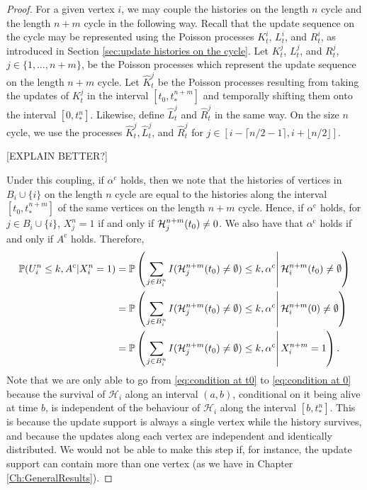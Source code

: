 \begin{proof}
		For a given vertex $i$, we may couple the histories on the length $n$ cycle and the length $n+m$ cycle in the following way. Recall that the update sequence on the cycle may be represented using the Poisson processes $K_t^i$, $L_t^i$, and $R_t^i$, as introduced in Section \ref{sec:update histories on the cycle}. Let $K_t^j$, $L_t^j$, and $R_t^j$, $j \in \{1,\dots, n+m\}$, be the Poisson processes which represent the update sequence on the length $n+m$ cycle. Let $\hat{K}_t^j$ be the Poisson processes resulting from taking the updates of $K_t^j$ in the interval $[t_0, t_*^{n+m}]$ and temporally shifting them onto the interval $[0, t_*^n]$. Likewise, define $\hat{L}_t^j$ and $\hat{R}_t^j$ in the same way. On the size $n$ cycle, we use the processes $\hat{K}_t^j, \hat{L}_t^j$, and $\hat{R}_t^j$ for $j \in [i- \lceil n/2 - 1 \rceil, i + \lfloor n/2\rfloor]$. 

		[EXPLAIN BETTER?]

		Under this coupling, if $\alpha^\mathrm{c}$ holds, then we note that the histories of vertices in $B_i \cup \{i\}$ on the length $n$ cycle are equal to the histories along the interval $[t_0, t_*^{n+m}]$ of the same vertices on the length $n+m$ cycle. Hence, if $\alpha^\mathrm{c}$ holds, for $j \in B_i \cup \{i\}$, $X_j^n = 1$ if and only if $\mathcal{H}_j^{n+m}(t_0) \neq 0$. We also have that $\alpha^\mathrm{c}$ holds if and only if $A^\mathrm{c}$ holds. Therefore,
		\begin{align}
			\mathbb{P}(U_i^n \leq k, A^\mathrm{c} | X_i^n = 1) &= \mathbb{P}\left(\left.\sum_{j \in B_i^n} I(\mathcal{H}_j^{n+m}(t_0) \neq \emptyset) \leq k, \alpha^\mathrm{c} \right| \mathcal{H}_i^{n+m}(t_0) \neq \emptyset \right) \label{eq:condition at t0}\\
			&= \mathbb{P}\left(\left.\sum_{j \in B_i^n} I(\mathcal{H}_j^{n+m}(t_0) \neq \emptyset) \leq k, \alpha^\mathrm{c} \right| \mathcal{H}_i^{n+m}(0) \neq \emptyset \right) \label{eq:condition at 0}\\
			&= \mathbb{P}\left(\left.\sum_{j \in B_i^n} I(\mathcal{H}_j^{n+m}(t_0) \neq \emptyset) \leq k, \alpha^\mathrm{c} \right| X_i^{n+m} = 1 \right).
		\end{align}
		Note that we are only able to go from \eqref{eq:condition at t0} to \eqref{eq:condition at 0} because the survival of $\mathcal{H}_i$ along an interval $(a, b)$, conditional on it being alive at time $b$, is independent of the behaviour of $\mathcal{H}_i$ along the interval $[b, t_*^n]$. This is because the update support is always a single vertex while the history survives, and because the updates along each vertex are independent and identically distributed. We would not be able to make this step if, for instance, the update support can contain more than one vertex (as we have in Chapter \ref{Ch:GeneralResults}).



\end{proof}
